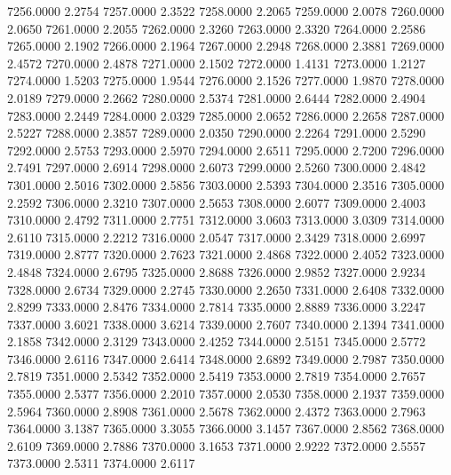 7256.0000      2.2754
7257.0000      2.3522
7258.0000      2.2065
7259.0000      2.0078
7260.0000      2.0650
7261.0000      2.2055
7262.0000      2.3260
7263.0000      2.3320
7264.0000      2.2586
7265.0000      2.1902
7266.0000      2.1964
7267.0000      2.2948
7268.0000      2.3881
7269.0000      2.4572
7270.0000      2.4878
7271.0000      2.1502
7272.0000      1.4131
7273.0000      1.2127
7274.0000      1.5203
7275.0000      1.9544
7276.0000      2.1526
7277.0000      1.9870
7278.0000      2.0189
7279.0000      2.2662
7280.0000      2.5374
7281.0000      2.6444
7282.0000      2.4904
7283.0000      2.2449
7284.0000      2.0329
7285.0000      2.0652
7286.0000      2.2658
7287.0000      2.5227
7288.0000      2.3857
7289.0000      2.0350
7290.0000      2.2264
7291.0000      2.5290
7292.0000      2.5753
7293.0000      2.5970
7294.0000      2.6511
7295.0000      2.7200
7296.0000      2.7491
7297.0000      2.6914
7298.0000      2.6073
7299.0000      2.5260
7300.0000      2.4842
7301.0000      2.5016
7302.0000      2.5856
7303.0000      2.5393
7304.0000      2.3516
7305.0000      2.2592
7306.0000      2.3210
7307.0000      2.5653
7308.0000      2.6077
7309.0000      2.4003
7310.0000      2.4792
7311.0000      2.7751
7312.0000      3.0603
7313.0000      3.0309
7314.0000      2.6110
7315.0000      2.2212
7316.0000      2.0547
7317.0000      2.3429
7318.0000      2.6997
7319.0000      2.8777
7320.0000      2.7623
7321.0000      2.4868
7322.0000      2.4052
7323.0000      2.4848
7324.0000      2.6795
7325.0000      2.8688
7326.0000      2.9852
7327.0000      2.9234
7328.0000      2.6734
7329.0000      2.2745
7330.0000      2.2650
7331.0000      2.6408
7332.0000      2.8299
7333.0000      2.8476
7334.0000      2.7814
7335.0000      2.8889
7336.0000      3.2247
7337.0000      3.6021
7338.0000      3.6214
7339.0000      2.7607
7340.0000      2.1394
7341.0000      2.1858
7342.0000      2.3129
7343.0000      2.4252
7344.0000      2.5151
7345.0000      2.5772
7346.0000      2.6116
7347.0000      2.6414
7348.0000      2.6892
7349.0000      2.7987
7350.0000      2.7819
7351.0000      2.5342
7352.0000      2.5419
7353.0000      2.7819
7354.0000      2.7657
7355.0000      2.5377
7356.0000      2.2010
7357.0000      2.0530
7358.0000      2.1937
7359.0000      2.5964
7360.0000      2.8908
7361.0000      2.5678
7362.0000      2.4372
7363.0000      2.7963
7364.0000      3.1387
7365.0000      3.3055
7366.0000      3.1457
7367.0000      2.8562
7368.0000      2.6109
7369.0000      2.7886
7370.0000      3.1653
7371.0000      2.9222
7372.0000      2.5557
7373.0000      2.5311
7374.0000      2.6117
